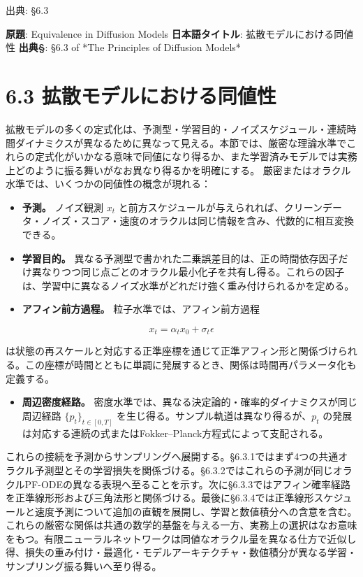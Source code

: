 

{\color{gray}\footnotesize 出典: §6.3\par}
\vspace{0.2em}
\begin{propositionbox}[原題]
\textbf{原題}: Equivalence in Diffusion Models
\textbf{日本語タイトル}: 拡散モデルにおける同値性
\textbf{出典§}: §6.3 of *The Principles of Diffusion Models*
\end{propositionbox}


\section*{6.3 拡散モデルにおける同値性}


拡散モデルの多くの定式化は、予測型・学習目的・ノイズスケジュール・連続時間ダイナミクスが異なるために異なって見える。本節では、厳密な理論水準でこれらの定式化がいかなる意味で同値になり得るか、また学習済みモデルでは実務上どのように振る舞いがなお異なり得るかを明確にする。
厳密またはオラクル水準では、いくつかの同値性の概念が現れる：

\begin{itemize}
\item \textbf{予測。} ノイズ観測 $x_t$ と前方スケジュールが与えられれば、クリーンデータ・ノイズ・スコア・速度のオラクルは同じ情報を含み、代数的に相互変換できる。
\item \textbf{学習目的。} 異なる予測型で書かれた二乗誤差目的は、正の時間依存因子だけ異なりつつ同じ点ごとのオラクル最小化子を共有し得る。これらの因子は、学習中に異なるノイズ水準がどれだけ強く重み付けられるかを定める。
\item \textbf{アフィン前方過程。} 粒子水準では、アフィン前方過程
\end{itemize}

\[
x_t=\alpha_t x_0+\sigma_t\epsilon
\]

  は状態の再スケールと対応する正準座標を通じて正準アフィン形と関係づけられる。この座標が時間とともに単調に発展するとき、関係は時間再パラメータ化も定義する。
\begin{itemize}
\item \textbf{周辺密度経路。} 密度水準では、異なる決定論的・確率的ダイナミクスが同じ周辺経路 $\{p_t\}_{t\in[0,T]}$ を生じ得る。サンプル軌道は異なり得るが、$p_t$ の発展は対応する連続の式またはFokker–Planck方程式によって支配される。
\end{itemize}


これらの接続を予測からサンプリングへ展開する。§6.3.1ではまず4つの共通オラクル予測型とその学習損失を関係づける。§6.3.2ではこれらの予測が同じオラクルPF-ODEの異なる表現へ至ることを示す。次に§6.3.3ではアフィン確率経路を正準線形形および三角法形と関係づける。最後に§6.3.4では正準線形スケジュールと速度予測について追加の直観を展開し、学習と数値積分への含意を含む。
これらの厳密な関係は共通の数学的基盤を与える一方、実務上の選択はなお意味をもつ。有限ニューラルネットワークは同値なオラクル量を異なる仕方で近似し得、損失の重み付け・最適化・モデルアーキテクチャ・数値積分が異なる学習・サンプリング振る舞いへ至り得る。

